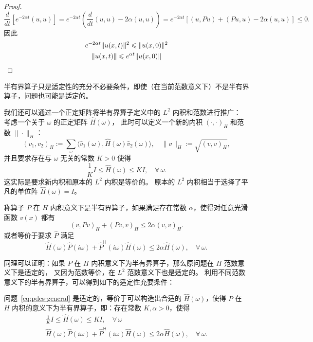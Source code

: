 \begin{proof}
    \[
        \frac{d}{dt} \left[ e^{-2\alpha  t}(u,u) \right]
        =e^{-2\alpha t}(\frac{d}{dt}(u,u)-2\alpha (u,u))
        = e^{-2 \alpha t}\left[(u ,P u) + (P u,u) - 2\alpha (u,u)\right] \le 0.
    \]
    因此
    \begin{gather*}
        e^{-2\alpha t} \| u(x,t) \|^2 \le  \| u(x,0) \|^2 \\
        \| u(x,t) \| \le e^{\alpha t}\| u(x,0) \| \qedhere
    \end{gather*}
\end{proof}

\begin{remark}
    半有界算子只是适定性的充分不必要条件，即使（在当前范数意义下）不是半有界算子，问题也可能是适定的。
\end{remark}

我们还可以通过一个正定矩阵将半有界算子定义中的 $L^2$ 内积和范数进行推广：
考虑一个关于 $\omega $ 的正定矩阵 $\widehat{H}(\omega)$，
此时可以定义一个新的内积 $(\cdot,\cdot)_H$ 和范数 $\| \cdot \|_H$：
\[
    (v_1,v_2)_H := \sum_\omega \langle\hat{v}_1(\omega),\widehat{H}(\omega)\hat{v}_2(\omega)\rangle,\quad
    \| v \|_H := \sqrt{(v,v)_H},
\]
并且要求存在与 $\omega $ 无关的常数 $K>0$ 使得
\[
    \frac{1}{K}I \le \widehat{H}(\omega ) \le K I,\quad \forall\,\omega.
\]
这实际是要求新内积和原本的 $L^2$ 内积是等价的。
原本的 $L^2$ 内积相当于选择了平凡的单位阵 $\widehat{H}(\omega ) = I$。

\begin{definition}
    称算子 $P$ 在 $H$ 内积意义下是半有界算子，如果满足存在常数 $\alpha$，使得对任意光滑函数 $v(x)$ 都有
    \[
        (v,Pv)_H + (Pv,v)_H \le 2\alpha (v,v)_H.
    \]
    或者等价于要求 $\widehat{P}$ 满足
    \[
        \widehat{H}(\omega ) \widehat{P}(i \omega) + \widehat{P}^{\mathsf{H}}(i \omega) \widehat{H}(\omega ) \le 2\alpha \widehat{H}(\omega ),\quad \forall\,\omega.
    \]
\end{definition}
同理可以证明：如果 $P$ 在 $H$ 内积意义下为半有界算子，那么原问题在 $H$ 范数意义下是适定的，
又因为范数等价，在 $L^2$ 范数意义下也是适定的。
利用不同范数意义下的半有界算子，可以得到如下的适定性充要条件：

\begin{theorem}\label{thm:well-posed-7}
    问题~\eqref{eq:pdes-general} 是适定的，等价于可以构造出合适的 $\widehat{H}(\omega )$，使得 $P$ 在 $H$ 内积的意义下为半有界算子，即：存在常数 $K,\alpha >0$，使得
    \begin{gather}
        \frac{1}{K}I \le \widehat{H}(\omega ) \le K I, \quad \forall\,\omega  \label{eq:well-posed-condition-1}\\
        \widehat{H}(\omega ) \widehat{P}(i \omega) + \widehat{P}^{\mathsf{H}}(i \omega) \widehat{H}(\omega ) \le 2\alpha \widehat{H}(\omega ),\quad \forall\,\omega. \label{eq:well-posed-condition-2}
    \end{gather}
\end{theorem}


